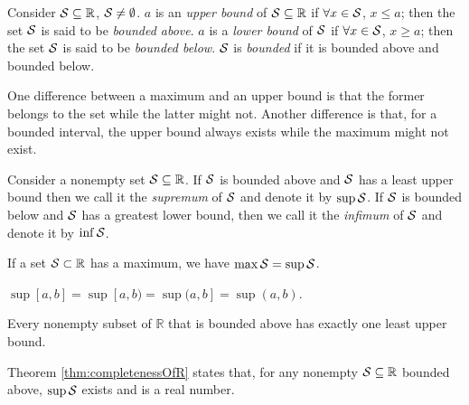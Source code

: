 \begin{defn}
  Consider ${\cal S}\subseteq \mathbb{R}$,
   ${\cal S}\ne \emptyset$.
  $a$ is an \emph{upper bound} of ${\cal S}\subseteq \mathbb{R}$
  if $\forall x\in {\cal S}$, $x\le a$;
   then the set ${\cal S}$ is said to be \emph{bounded above}.
  $a$ is a \emph{lower bound} of ${\cal S}$
   if $\forall x\in {\cal S}$, $x\ge a$;
   then the set ${\cal S}$ is said to be \emph{bounded below}.
  ${\cal S}$ is \emph{bounded}
   if it is bounded above and bounded below.
\end{defn}

\begin{rem}
One difference between a maximum and an upper bound
 is that the former belongs to the set
 while the latter might not.
Another difference is that,
 for a bounded interval,
 the upper bound always exists
 while the maximum might not exist.
\end{rem}

\begin{defn}
  Consider a nonempty set \mbox{${\cal S}\subseteq \mathbb{R}$}.
  If ${\cal S}$ is bounded above and ${\cal S}$
   has a least upper bound 
   then we call it the \emph{supremum}
   of ${\cal S}$
   and denote it by $\sup {\cal S}$.
  If ${\cal S}$ is bounded below and ${\cal S}$
   has a greatest lower bound,
   then we call it the \emph{infimum}
   of ${\cal S}$
   and denote it by $\inf {\cal S}$.
\end{defn}

\begin{exm}
  If a set ${\cal S}\subset \mathbb{R}$ has a maximum,
   we have \mbox{$\max{\cal S}=\sup {\cal S}$}.
\end{exm}

\begin{exm}
  $\sup[a,b]=\sup[a,b)=\sup(a,b]=\sup(a,b)$.
\end{exm}

\begin{thm}%
  \label{thm:completenessOfR}
  Every nonempty subset of $\mathbb{R}$ %
   that is bounded above has exactly one least upper bound.
\end{thm}

\begin{rem}
  Theorem \ref{thm:completenessOfR} states that, 
  for any nonempty ${\cal S}\subseteq \mathbb{R}$ bounded above,
  $\sup {\cal S}$ exists and is a real number.
\end{rem}

